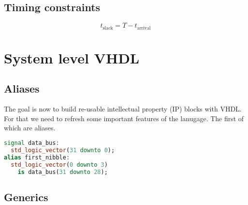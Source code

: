 \documentclass[margin=small]{tex/hsrzf}
\begin{document}
\subsection{Timing constraints}


\[
  t_\text{slack} = T - t_\text{arrival}
\]

\section{System level VHDL}

\subsection{Aliases}
The goal is now to build re-usable intellectual property (IP) blocks with VHDL. For that we need to refresh some important features of the lanugage. The first of which are aliases.
\begin{lstlisting}[language=vhdl]
signal data_bus:
  std_logic_vector(31 downto 0);
alias first_nibble:
  std_logic_vector(0 downto 3)
    is data_bus(31 downto 28);
\end{lstlisting}

\subsection{Generics}
\end{document}
